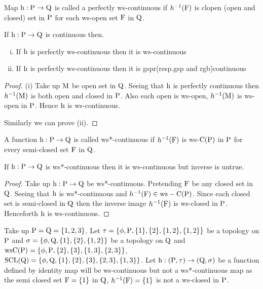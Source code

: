 \begin{dfn}\label{defi3.2.5}
Map $\mathrm{h}: \mathrm{P}\to \mathrm{Q}$ is called a perfectly ws-continuous if $h^{-1} (\mathrm{F})$ is clopen (open and closed) set in $\mathrm{P}$ for each ws-open set $\mathrm{F}$ in $\mathrm{Q}$.
\end{dfn}

\begin{thm}\label{thm3.2.11}
If $\mathrm{h}: \mathrm{P}\to \mathrm{Q}$ is continuous then.
\begin{enumerate}[(i)]
\item If $\mathrm{h}$ is perfectly ws-continuous then it is ws-continuous
\item If $\mathrm{h}$ is perfectly ws-continuous then it is gspr(resp.gsp and rgb)continuous
\end{enumerate}
\end{thm}

\begin{proof}
(i) Take up $\mathrm{M}$ be open set in $\mathrm{Q}$. Seeing that $\mathrm{h}$ is perfectly continuous then $h^{-1} (\mathrm{M})$ is both open and closed in $\mathrm{P}$. Also each open is ws-open, $h^{-1} (\mathrm{M})$ is ws-open in $\mathrm{P}$. Hence $\mathrm{h}$ is ws-continuous.

Similarly we can prove (ii).
\end{proof}

\begin{dfn}\label{defi3.2.6}
A function $\mathrm{h}: \mathrm{P}\to \mathrm{Q}$ is called ws*-continuous if $h^{-1} (\mathrm{F})$ is ws-$\mathrm{C}(\mathrm{P})$ in $\mathrm{P}$ for every semi-closed set $\mathrm{F}$ in $\mathrm{Q}$.
\end{dfn}

\begin{thm}\label{thm3.2.12}
If $\mathrm{h}: \mathrm{P}\to \mathrm{Q}$ is ws*-continuous then it is ws-continuous but inverse is untrue.
\end{thm}

\begin{proof}
Take up $\mathrm{h}: \mathrm{P}\to \mathrm{Q}$ be ws*-continuous. Pretending $\mathrm{F}$ be any closed set in $\mathrm{Q}$. Seeing that $\mathrm{h}$ is ws*-continuous and $h^{-1} (\mathrm{F}) \in \mathrm{ws}-\mathrm{C}(\mathrm{P})$. Since each closed set is semi-closed in $\mathrm{Q}$ then the inverse image $h^{-1}(\mathrm{F})$ is ws-closed in $\mathrm{P}$. Henceforth $\mathrm{h}$ is ws-continuous.
\end{proof}

\begin{exm}\label{exam3.2.10}
Take up $\mathrm{P}=\mathrm{Q}= \{1, 2, 3\}$. Let $\tau = \{\phi, \mathrm{P}, \{1\}, \{2\}, \{1, 2\},\{1,2\}\}$ be a topology on $\mathrm{P}$ and $\sigma =\{\phi, \mathrm{Q}, \{1\}, \{2\},\{1,2\}\}$ be a topology on $\mathrm{Q}$ and $\mathrm{ws}\mathrm{C}(\mathrm{P})= \{\phi, \mathrm{P}, \{2\},\{3\}, \{1, 3\},\{2,3\}\}$, $\mathrm{SCL}(\mathrm{Q})= \{\phi, \mathrm{Q}, \{1\}, \{2\},\{3\}, \{2, 3\},\{1,3\}\}$. Let $\mathrm{h}: (\mathrm{P},\tau )\to (\mathrm{Q}, \sigma)$ be a function defined by identity map will be ws-continuous but not a ws*-continuous map as the semi closed set $\mathrm{F}=\{1\}$ in $\mathrm{Q}$, $h^{-1} (\mathrm{F})=\{1\}$ is not a ws-closed in $\mathrm{P}$.
\end{exm}

